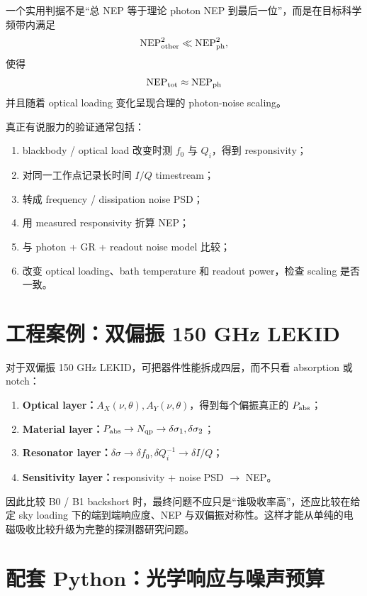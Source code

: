 \documentclass[11pt,a4paper,openany]{ctexrep}
\begin{document}
一个实用判据不是“总 NEP 等于理论 photon NEP 到最后一位”，而是在目标科学频带内满足
\[
\mathrm{NEP}_{\rm other}^2
\ll
\mathrm{NEP}_{\rm ph}^2,
\]
使得
\[
\mathrm{NEP}_{\rm tot}
\approx
\mathrm{NEP}_{\rm ph}
\]
并且随着 optical loading 变化呈现合理的 photon-noise scaling。

真正有说服力的验证通常包括：
\begin{enumerate}
  \item blackbody / optical load 改变时测 $f_0$ 与 $Q_i$，得到 responsivity；
  \item 对同一工作点记录长时间 $I/Q$ timestream；
  \item 转成 frequency / dissipation noise PSD；
  \item 用 measured responsivity 折算 NEP；
  \item 与 photon + GR + readout noise model 比较；
  \item 改变 optical loading、bath temperature 和 readout power，检查 scaling 是否一致。
\end{enumerate}

\section{工程案例：双偏振 150 GHz LEKID}

\begin{projectbox}
对于双偏振 150 GHz LEKID，可把器件性能拆成四层，而不只看 absorption 或 notch：
\begin{enumerate}
  \item \textbf{Optical layer：}$A_X(\nu,\theta),A_Y(\nu,\theta)$，得到每个偏振真正的 $P_{\rm abs}$；
  \item \textbf{Material layer：}$P_{\rm abs}\rightarrow N_{\rm qp}\rightarrow\delta\sigma_1,\delta\sigma_2$；
  \item \textbf{Resonator layer：}$\delta\sigma\rightarrow\delta f_0,\delta Q_i^{-1}\rightarrow\delta I/Q$；
  \item \textbf{Sensitivity layer：}responsivity + noise PSD $\rightarrow$ NEP。
\end{enumerate}
因此比较 B0 / B1 backshort 时，最终问题不应只是“谁吸收率高”，还应比较在给定 sky loading 下的端到端响应度、NEP 与双偏振对称性。这样才能从单纯的电磁吸收比较升级为完整的探测器研究问题。
\end{projectbox}

\section{配套 Python：光学响应与噪声预算}
\end{document}
